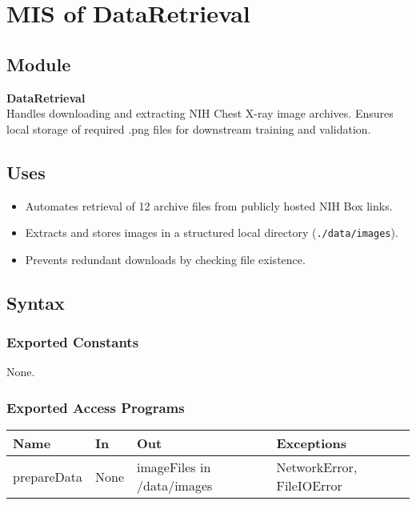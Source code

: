 \documentclass[12pt, titlepage]{article}
\begin{document}
\section{MIS of DataRetrieval}

\subsection{Module}
\textbf{DataRetrieval} \\
Handles downloading and extracting NIH Chest X-ray image archives. Ensures local storage of required .png files for downstream training and validation.

\subsection{Uses}
\begin{itemize}
    \item Automates retrieval of 12 archive files from publicly hosted NIH Box links.
    \item Extracts and stores images in a structured local directory (\texttt{./data/images}).
    \item Prevents redundant downloads by checking file existence.
\end{itemize}

\subsection{Syntax}

\subsubsection{Exported Constants}
None.

\subsubsection{Exported Access Programs}

\begin{center}
  \begin{tabular}{|p{4cm}|p{4cm}|p{4cm}|p{4cm}|}
    \hline
    \textbf{Name} & \textbf{In} & \textbf{Out} & \textbf{Exceptions} \\
    \hline
    prepareData & None & imageFiles in /data/images & NetworkError, FileIOError \\
    \hline
  \end{tabular}
\end{center}
\end{document}
